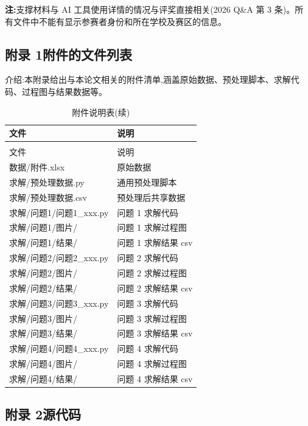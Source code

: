 \noindent\textbf{注:}支撑材料与 AI 工具使用详情的情况与评奖直接相关(2026 Q\&A 第 3 条)。所有文件中不能有显示参赛者身份和所在学校及赛区的信息。

\subsection*{附录 1\quad 附件的文件列表}

介绍:本附录给出与本论文相关的附件清单,涵盖原始数据、预处理脚本、求解代码、过程图与结果数据等。

\begin{longtable}{>{\centering\arraybackslash}p{}>{\centering\arraybackslash}p{}}
  \caption{附件说明表}\\
  \toprule
  文件 & 说明 \\
  \midrule
  \endfirsthead
  \caption{附件说明表(续)}\\
  \toprule
  文件 & 说明 \\
  \midrule
  \endhead
  \bottomrule
  \endfoot
  数据/附件.xlsx & 原始数据 \\
  求解/预处理数据.py & 通用预处理脚本 \\
  求解/预处理数据.csv & 预处理后共享数据 \\
  求解/问题1/问题1\_xxx.py & 问题 1 求解代码 \\
  求解/问题1/图片/ & 问题 1 求解过程图 \\
  求解/问题1/结果/ & 问题 1 求解结果 csv \\
  求解/问题2/问题2\_xxx.py & 问题 2 求解代码 \\
  求解/问题2/图片/ & 问题 2 求解过程图 \\
  求解/问题2/结果/ & 问题 2 求解结果 csv \\
  求解/问题3/问题3\_xxx.py & 问题 3 求解代码 \\
  求解/问题3/图片/ & 问题 3 求解过程图 \\
  求解/问题3/结果/ & 问题 3 求解结果 csv \\
  求解/问题4/问题4\_xxx.py & 问题 4 求解代码 \\
  求解/问题4/图片/ & 问题 4 求解过程图 \\
  求解/问题4/结果/ & 问题 4 求解结果 csv \\
\end{longtable}

\subsection*{附录 2\quad 源代码}

